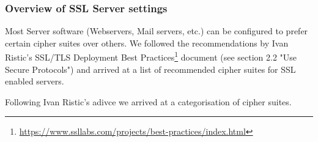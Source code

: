 
%

\subsubsection{Overview of SSL Server settings}


Most Server software (Webservers, Mail servers, etc.) can be configured to prefer certain cipher suites over others. 
We followed the recommendations by Ivan Ristic's SSL/TLS Deployment Best Practices\footnote{\url{https://www.ssllabs.com/projects/best-practices/index.html}} document (see section 2.2 "Use Secure Protocols") and arrived at a list of recommended cipher suites for SSL enabled servers.

Following Ivan Ristic's adivce we arrived at a categorisation of cipher suites.

